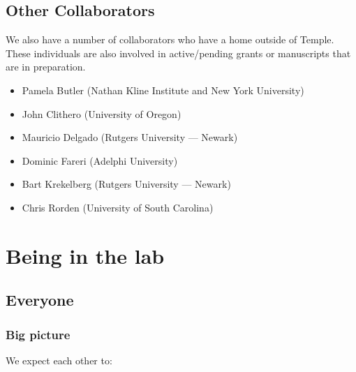 \documentclass[letterpaper,12pt,oneside]{memoir}
\begin{document}
\section{Other Collaborators}

We also have a number of collaborators who have a home outside of Temple. These individuals are also involved in active/pending grants or manuscripts that are in preparation. \\

\begin{itemize}[noitemsep,nolistsep]
\item Pamela Butler (Nathan Kline Institute and New York University)
\item John Clithero (University of Oregon)
\item Mauricio Delgado (Rutgers University --- Newark)
\item Dominic Fareri (Adelphi University)
\item Bart Krekelberg (Rutgers University --- Newark)
\item Chris Rorden (University of South Carolina) 
\end{itemize}



\chapter{Being in the lab}

\section{Everyone}

\subsection{Big picture}

We expect each other to:
\end{document}
